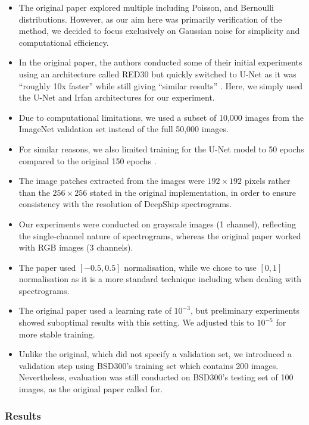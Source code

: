 \begin{itemize}
    \item The original paper explored multiple including Poisson, and Bernoulli distributions. However, as our aim here was primarily verification of the method, we decided to focus exclusively on Gaussian noise for simplicity and computational efficiency.
    \item In the original paper, the authors conducted some of their initial experiments using an architecture called RED30 \cite{mao_image_2016} but quickly switched to U-Net as it was ``roughly 10x faster'' while still giving ``similar results'' \cite[3]{ronneberger_u-net_2015}. Here, we simply used the U-Net and Irfan architectures for our experiment.
    \item Due to computational limitations, we used a subset of 10,000 images from the ImageNet validation set instead of the full 50,000 images. 
    \item For similar reasons, we also limited training for the U-Net model to 50 epochs compared to the original 150 epochs \cite[Fig 1.]{lehtinen_noise2noise_2018}. 
    \item The image patches extracted from the images were $192 \times 192$ pixels rather than the $256 \times 256$ stated in the original implementation, in order to ensure consistency with the resolution of DeepShip spectrograms.
    \item Our experiments were conducted on grayscale images (1 channel), reflecting the single-channel nature of spectrograms, whereas the original paper worked with RGB images (3 channels).
    \item The paper used $[-0.5, 0.5]$ normalisation, while we chose to use $[0, 1]$ normalisation as it is a more standard technique including when dealing with spectrograms.
    \item The original paper used a learning rate of $10^{-3}$, but preliminary experiments showed suboptimal results with this setting. We adjusted this to $10^{-5}$ for more stable training.
    \item Unlike the original, which did not specify a validation set, we introduced a validation step using BSD300's training set which contains 200 images. Nevertheless, evaluation was still conducted on BSD300's testing set of 100 images, as the original paper called for.
\end{itemize}

\subsubsection{Results}

